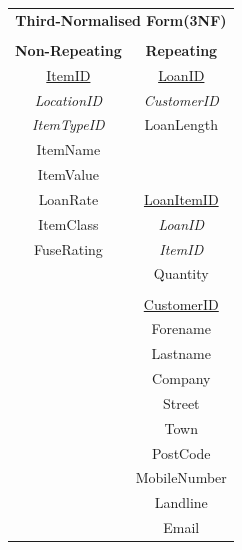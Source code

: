 \begin{center}
    \begin{tabular}{|c|c|}
        \hline
        \multicolumn{2}{|c|}{\textbf{Third-Normalised Form(3NF)}}  \\
        \multicolumn{2}{|c|}{ }                                    \\ \hline
        \textbf{Non-Repeating}     & \textbf{Repeating}            \\ \hline
        \underline{ItemID}         & \underline{LoanID}            \\
        \emph{LocationID}          & \emph{CustomerID}             \\
        \emph{ItemTypeID}          & LoanLength                    \\
        ItemName                   &                               \\
        ItemValue	              &                               \\
        LoanRate                   & \underline{LoanItemID}        \\
        ItemClass                  & \emph{LoanID}                 \\
        FuseRating                 & \emph{ItemID}                 \\
                                   & Quantity                      \\
                                   &                               \\ 
                                   &\underline{CustomerID}         \\
                                   & Forename                      \\
                                   & Lastname                      \\ 
                                   & Company                       \\ 
                                   & Street                        \\ 
                                   & Town                          \\ 
                                   & PostCode                      \\ 
                                   & MobileNumber                  \\ 
                                   & Landline                      \\ 
                                   & Email                         \\ 

\end{tabular}
\end{center}
